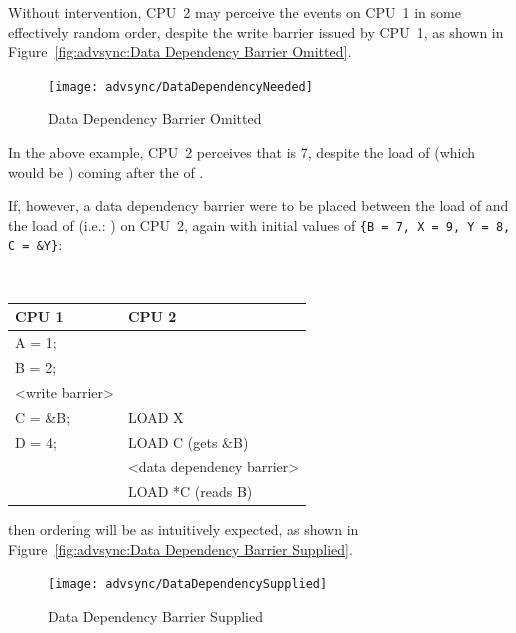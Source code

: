 Without intervention, CPU~2 may perceive the events on CPU~1 in some
effectively random order, despite the write barrier issued by CPU~1, as
shown in Figure~\ref{fig:advsync:Data Dependency Barrier Omitted}.

\begin{figure}[htb]
\begin{center}
\texttt{[image: advsync/DataDependencyNeeded]}
\end{center}
\caption{Data Dependency Barrier Omitted}
\end{figure}

In the above example, CPU~2 perceives that  is 7,
despite the load of 
(which would be ) coming after the  of .

If, however, a data dependency barrier were to be placed between the load of
 and the load of  (i.e.: ) on CPU~2, again with initial
values of {\tt \{B = 7, X = 9, Y = 8, C = \&Y\}}:

\vspace{5pt}
\begin{minipage}[t]{\columnwidth}
\tt
\scriptsize
\begin{tabular}{l|p{1.5in}}
	CPU 1 &		CPU 2 \\
	\hline
	A = 1; & \\
	B = 2; & \\
	<write barrier> & \\
	C = \&B; & 	LOAD X\\
	D = 4;	&	LOAD C (gets \&B) \\
		&	<data dependency barrier> \\
		&	LOAD *C (reads B) \\
\end{tabular}
\end{minipage}
\vspace{5pt}

then ordering will be as intuitively expected, as shown in
Figure~\ref{fig:advsync:Data Dependency Barrier Supplied}.

\begin{figure}[htb]
\begin{center}
\texttt{[image: advsync/DataDependencySupplied]}
\end{center}
\caption{Data Dependency Barrier Supplied}
\end{figure}

